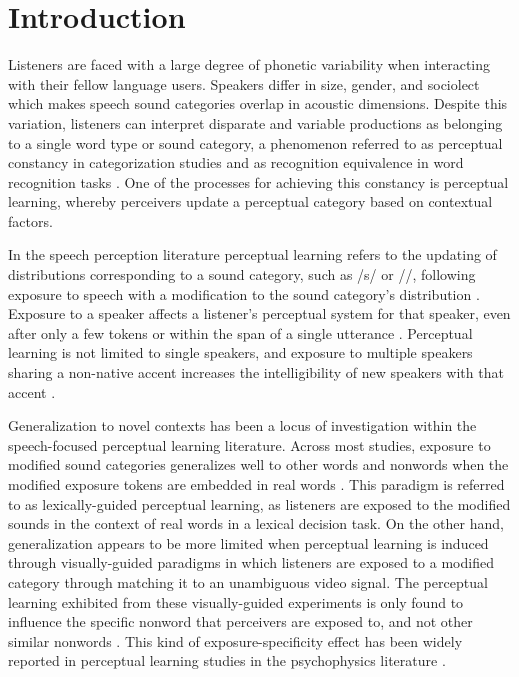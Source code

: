 
\chapter{Introduction}

Listeners are faced with a large degree of phonetic variability when interacting with their fellow language users.  
Speakers differ in size, gender, and sociolect which makes speech sound categories overlap in acoustic dimensions.
Despite this variation, listeners can interpret disparate and variable productions as belonging to a single word type or sound category, a phenomenon referred to as perceptual constancy in categorization studies \citep{Shankweiler1977, Kuhl1979} and as recognition equivalence in word recognition tasks \citep{Sumner2013}.
One of the processes for achieving this constancy is perceptual learning, whereby perceivers update a perceptual category based on contextual factors.

In the speech perception literature perceptual learning refers to the updating of distributions corresponding to a sound category, such as /s/ or /\textesh/, following exposure to speech with a modification to the sound category's distribution \citep{Norris2003}.
Exposure to a speaker affects a listener's perceptual system for that speaker,  even after only a few tokens \citep{Vroomen2007, Kraljic2008} or within the span of a single utterance \citep{Ladefoged1957}.
Perceptual learning is not limited to single speakers, and exposure to multiple speakers sharing a non-native accent increases the intelligibility of new speakers with that accent \citep{Bradlow2008}.

Generalization to novel contexts has been a locus of investigation within the speech-focused perceptual learning literature. Across most studies, exposure to modified sound categories generalizes well to other words and nonwords when the modified exposure tokens are embedded in real words \citep{Norris2003, Reinisch2013}.  
This paradigm is referred to as lexically-guided perceptual learning, as listeners are exposed to the modified sounds in the context of real words in a lexical decision task.
On the other hand, generalization appears to be more limited when perceptual learning is induced through visually-guided paradigms in which listeners are exposed to a modified category through matching it to an unambiguous video signal.  
The perceptual learning exhibited from these visually-guided experiments is only found to influence the specific nonword that perceivers are exposed to, and not other similar nonwords \citep{Reinisch2014}.  
This kind of exposure-specificity effect has been widely reported in perceptual learning studies in the psychophysics literature \citep{Gibson1953}.

